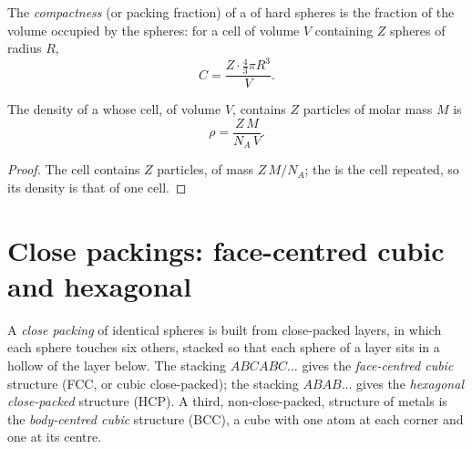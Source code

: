 \begin{definition}[Compactness]\label{def:b1:crystals-metals:compactness}
The \emph{compactness} (or packing fraction) of a
 of hard spheres is the fraction of the volume occupied by the
spheres: for a cell of volume $V$ containing $Z$ spheres of radius $R$,
\[
  C = \frac{Z \cdot \frac43 \pi R^3}{V} .
\]
\end{definition}

\begin{proposition}\label{prop:b1:crystals-metals:density}
The density of a  whose cell, of volume $V$, contains $Z$
particles of molar mass $M$ is
\[
  \rho = \frac{Z\,M}{N_A\,V} .
\]
\end{proposition}

\begin{proof}
The cell contains $Z$ particles, of mass $Z\,M/N_A$; the  is
the cell repeated, so its density is that of one cell.
\end{proof}

\section{Close packings: face-centred cubic and hexagonal}

\begin{definition}\label{def:b1:crystals-metals:packings}
A \emph{close packing} of identical spheres is built
from close-packed layers, in which each sphere touches six others, stacked
so that each sphere of a layer sits in a hollow of the layer below. The
stacking $ABCABC\dots$ gives the \emph{face-centred cubic}
structure (FCC, or cubic close-packed); the stacking $ABAB\dots$
gives the \emph{hexagonal close-packed}
structure (HCP). A third, non-close-packed, structure of metals is the
\emph{body-centred cubic} structure (BCC), a
cube with one atom at each corner and one at its centre.
\end{definition}

